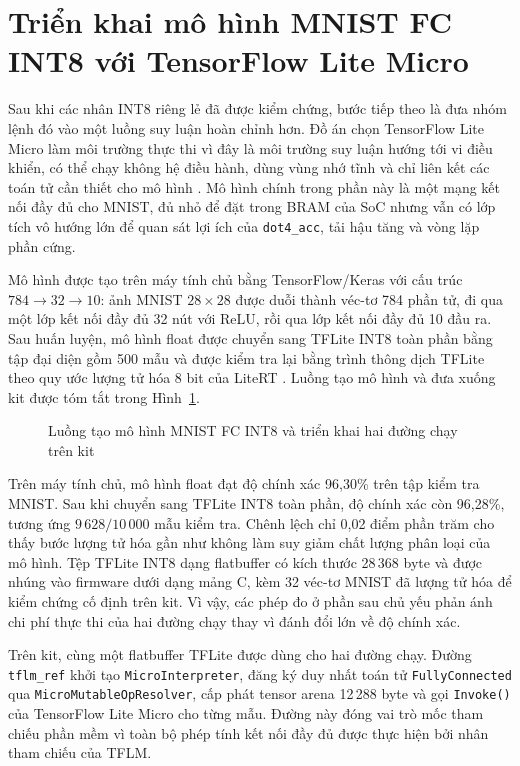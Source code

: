 \documentclass[../DoAn.tex]{subfiles}
\begin{document}
\section{Triển khai mô hình MNIST FC INT8 với TensorFlow Lite Micro}
\label{sec:trien-khai-mnist-fc-tflm}

Sau khi các nhân INT8 riêng lẻ đã được kiểm chứng, bước tiếp theo là đưa nhóm lệnh đó vào một luồng suy luận hoàn chỉnh hơn. Đồ án chọn TensorFlow Lite Micro làm môi trường thực thi vì đây là môi trường suy luận hướng tới vi điều khiển, có thể chạy không hệ điều hành, dùng vùng nhớ tĩnh và chỉ liên kết các toán tử cần thiết cho mô hình \cite{david2021tflm,google_litert_micro_2026}. Mô hình chính trong phần này là một mạng kết nối đầy đủ cho MNIST, đủ nhỏ để đặt trong BRAM của SoC nhưng vẫn có lớp tích vô hướng lớn để quan sát lợi ích của \texttt{dot4\_acc}, tải hậu tăng và vòng lặp phần cứng.

Mô hình được tạo trên máy tính chủ bằng TensorFlow/Keras với cấu trúc \(784 \rightarrow 32 \rightarrow 10\): ảnh MNIST \(28 \times 28\) được duỗi thành véc-tơ 784 phần tử, đi qua một lớp kết nối đầy đủ 32 nút với ReLU, rồi qua lớp kết nối đầy đủ 10 đầu ra. Sau huấn luyện, mô hình float được chuyển sang TFLite INT8 toàn phần bằng tập đại diện gồm 500 mẫu và được kiểm tra lại bằng trình thông dịch TFLite theo quy ước lượng tử hóa 8 bit của LiteRT \cite{google_litert_quant_spec}. Luồng tạo mô hình và đưa xuống kit được tóm tắt trong Hình~\ref{fig:mnist-fc-tflm-flow}.

\begin{figure}[H]
    \centering
    \resizebox{0.84\linewidth}{!}{}
    \caption{Luồng tạo mô hình MNIST FC INT8 và triển khai hai đường chạy trên kit}
    \label{fig:mnist-fc-tflm-flow}
\end{figure}

Trên máy tính chủ, mô hình float đạt độ chính xác 96,30\% trên tập kiểm tra MNIST. Sau khi chuyển sang TFLite INT8 toàn phần, độ chính xác còn 96,28\%, tương ứng \(9\,628/10\,000\) mẫu kiểm tra. Chênh lệch chỉ 0,02 điểm phần trăm cho thấy bước lượng tử hóa gần như không làm suy giảm chất lượng phân loại của mô hình. Tệp TFLite INT8 dạng flatbuffer có kích thước 28\,368 byte và được nhúng vào firmware dưới dạng mảng C, kèm 32 véc-tơ MNIST đã lượng tử hóa để kiểm chứng cố định trên kit. Vì vậy, các phép đo ở phần sau chủ yếu phản ánh chi phí thực thi của hai đường chạy thay vì đánh đổi lớn về độ chính xác.

Trên kit, cùng một flatbuffer TFLite được dùng cho hai đường chạy. Đường \texttt{tflm\_ref} khởi tạo \texttt{MicroInterpreter}, đăng ký duy nhất toán tử \texttt{FullyConnected} qua \texttt{MicroMutableOpResolver}, cấp phát tensor arena 12\,288 byte và gọi \texttt{Invoke()} của TensorFlow Lite Micro cho từng mẫu. Đường này đóng vai trò mốc tham chiếu phần mềm vì toàn bộ phép tính kết nối đầy đủ được thực hiện bởi nhân tham chiếu của TFLM.
\end{document}
